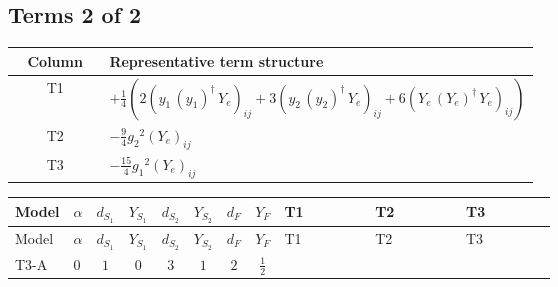 \documentclass[8pt]{article}
\begin{document}
\begin{landscape}
\subsection*{Terms 2 of 2}
\begin{center}
\begin{tabular}{@{}c >{\raggedright\arraybackslash}p{0.82\linewidth}@{}}
\toprule
Column & Representative term structure \\
\midrule
T1 & \(\displaystyle +\frac{1}{4} (2 \left({y_1}\,\left({y_1}\right)^{\dagger}\,{Y_e}\right)_{ij}+3 \left({y_2}\,\left({y_2}\right)^{\dagger}\,{Y_e}\right)_{ij}+6 \left({Y_e}\,\left({Y_e}\right)^{\dagger}\,{Y_e}\right)_{ij})\) \\
\midrule
T2 & \(\displaystyle -\frac{9}{4} {g_2}^2 \left({Y_e}\right)_{ij}\) \\
\midrule
T3 & \(\displaystyle -\frac{15}{4} {g_1}^2 \left({Y_e}\right)_{ij}\) \\
\midrule
\bottomrule
\end{tabular}
\end{center}
\smallskip
\tiny
\begin{longtable}{@{}llcccccc >{\raggedright\arraybackslash}p{0.21\linewidth} >{\raggedright\arraybackslash}p{0.21\linewidth} >{\raggedright\arraybackslash}p{0.21\linewidth}@{}}
\toprule
Model & $\alpha$ & $d_{S_1}$ & $Y_{S_1}$ & $d_{S_2}$ & $Y_{S_2}$ & $d_F$ & $Y_F$ & T1 & T2 & T3 \\
\midrule
\endfirsthead
\toprule
Model & $\alpha$ & $d_{S_1}$ & $Y_{S_1}$ & $d_{S_2}$ & $Y_{S_2}$ & $d_F$ & $Y_F$ & T1 & T2 & T3 \\
\midrule
\endhead
T3-A & $0$ & $1$ & $0$ & $3$ & $1$ & $2$ & $\frac{1}{2}$ & \scriptsize\adjustbox{max width=\linewidth}{$\begin{gathered} +\frac{1}{4} (2 \left({y_1}\,\left({y_1}\right)^{\dagger}\,{Y_e}\right)_{ij}+3 \left({y_2}\,\left({y_2}\right)^{\dagger}\,{Y_e}\right)_{ij}+6 \left({Y_e}\,\left({Y_e}\right)^{\dagger}\,{Y_e}\right)_{ij})\end{gathered}$} & \scriptsize\adjustbox{max width=\linewidth}{$\begin{gathered} -\frac{9}{4} {g_2}^2 \left({Y_e}\right)_{ij}\end{gathered}$} & \scriptsize\adjustbox{max width=\linewidth}{$\begin{gathered} -\frac{15}{4} {g_1}^2 \left({Y_e}\right)_{ij}\end{gathered}$} \\
\midrule
\bottomrule
\end{longtable}
\clearpage

\end{landscape}
\end{document}
